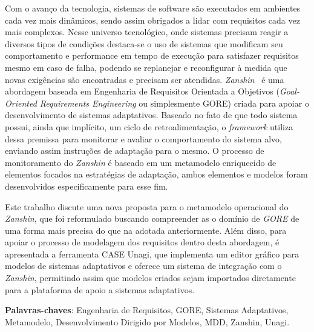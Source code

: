 \documentclass[
	12pt,				%
	openright,			%
	oneside,
	a4paper,			%
	english,			%
	french,				%
	spanish,			%
	brazil				%
	]{abntex2}
\newcommand{\vitor}[1]{\todo[author=\textbf{Vítor},color=red!30,caption={},inline]{#1}}
\newcommand{\awreqs}{\textit{AwReqs}\xspace}
\newcommand{\evoreqs}{\textit{EvoReqs}\xspace}
\newcommand{\gore}{\textit{GORE}\xspace}
\newcommand{\zanshin}{\textit{Zanshin}\xspace}
\newcommand{\framework}{\textit{framework}\xspace}
\begin{document}
\setlength{\absparsep}{18pt}
\begin{resumo}

Com o avanço da tecnologia, sistemas de software são executados em ambientes cada vez mais dinâmicos, sendo assim obrigados a lidar com requisitos cada vez mais complexos. Nesse universo tecnológico, onde sistemas precisam reagir a diversos tipos de condições destaca-se o uso de sistemas que modificam seu comportamento e performance em tempo de execução para satisfazer requisitos mesmo em caso de falha, podendo se replanejar e reconfigurar à medida que novas exigências são encontradas e precisam ser atendidas.
\zanshin~\cite{tesevitor} é uma abordagem baseada em Engenharia de Requisitos Orientada a Objetivos (\textit{Goal-Oriented Requirements Engineering} ou simplesmente GORE) criada para apoiar o desenvolvimento de sistemas adaptativos. Baseado no fato de que todo sistema possui, ainda que implícito, um ciclo de retroalimentação, o \framework utiliza dessa premissa para monitorar e avaliar o comportamento do sistema alvo, enviando assim instruções de adaptação para o mesmo. O processo de monitoramento do \zanshin é baseado em um metamodelo enriquecido de elementos focados na estratégias de adaptação, ambos elementos e modelos foram desenvolvidos especificamente para esse fim.

Este trabalho discute uma nova proposta para o metamodelo operacional do \zanshin, que foi reformulado buscando compreender as o domínio de \gore de uma forma mais precisa do que na adotada anteriormente.
Além disso, para apoiar o processo de modelagem dos requisitos dentro desta abordagem, é apresentada a ferramenta CASE Unagi, que implementa um editor gráfico para modelos de sistemas adaptativos e oferece um sistema de integração com o \zanshin, permitindo assim que modelos criados sejam importados diretamente para a plataforma de apoio a sistemas adaptativos.



\textbf{Palavras-chaves}: Engenharia de Requisitos, GORE, Sistemas Adaptativos, Metamodelo, Desenvolvimento Dirigido por Modelos, MDD, Zanshin, Unagi.
\end{resumo}
\end{document}
